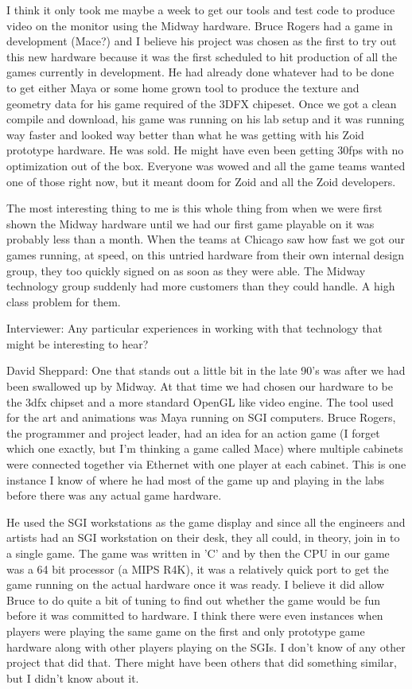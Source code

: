 I think it only took me maybe a week to get our tools and test code to produce video on the monitor using the Midway hardware. Bruce Rogers had a game in development (Mace?) and I believe his project was chosen as the first to try out this new hardware because it was the first scheduled to hit production of all the games currently in development. He had already done whatever had to be done to get either Maya or some home grown tool to produce the texture and geometry data for his game required of the 3DFX chipeset. Once we got a clean compile and download, his game was running on his lab setup and it was running way faster and looked way better than what he was getting with his Zoid prototype hardware. He was sold. He might have even been getting 30fps with no optimization out of the box. Everyone was wowed and all the game teams wanted one of those right now, but it meant doom for Zoid and all the Zoid developers.

The most interesting thing to me is this whole thing from when we were first shown the Midway hardware until we had our first game playable on it was probably less than a month. When the teams at Chicago saw how fast we got our games running, at speed, on this untried hardware from their own internal design group, they too quickly signed on as soon as they were able. The Midway technology group suddenly had more customers than they could handle. A high class problem for them.

\textcolor{interviewer}{Interviewer:} Any particular experiences in working with that technology that might be interesting to hear?

David Sheppard: One that stands out a little bit in the late 90's was after we had been swallowed up by Midway. At that time we had chosen our hardware to be the 3dfx chipset and a more standard OpenGL like video engine. The tool used for the art and animations was Maya running on SGI computers. Bruce Rogers, the programmer and project leader, had an idea for an action game (I forget which one exactly, but I'm thinking a game called Mace) where multiple cabinets were connected together via Ethernet with one player at each cabinet. This is one instance I know of where he had most of the game up and playing in the labs before there was any actual game hardware. 

He used the SGI workstations as the game display and since all the engineers and artists had an SGI workstation on their desk, they all could, in theory, join in to a single game. The game was written in 'C' and by then the CPU in our game was a 64 bit processor (a MIPS R4K), it was a relatively quick port to get the game running on the actual hardware once it was ready. I believe it did allow Bruce to do quite a bit of tuning to find out whether the game would be fun before it was committed to hardware. I think there were even instances when players were playing the same game on the first and only prototype game hardware along with other players playing on the SGIs. I don't know of any other project that did that. There might have been others that did something similar, but I didn't know about it.

